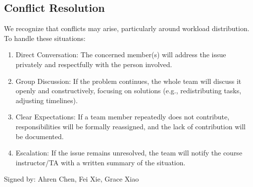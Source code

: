 \documentclass[11pt]{article}
\begin{document}
\subsection{Conflict Resolution}
We recognize that conflicts may arise, particularly around workload distribution. To handle
these situations:
\begin{enumerate}
  \item Direct Conversation: The concerned member(s) will address the issue privately
and respectfully with the person involved.
  \item Group Discussion: If the problem continues, the whole team will discuss it openly
and constructively, focusing on solutions (e.g., redistributing tasks, adjusting
timelines).
  \item Clear Expectations: If a team member repeatedly does not contribute,
responsibilities will be formally reassigned, and the lack of contribution will be
documented.
\item Escalation: If the issue remains unresolved, the team will notify the course
instructor/TA with a written summary of the situation.
\end{enumerate}

Signed by: Ahren Chen, Fei Xie, Grace Xiao
\end{document}
